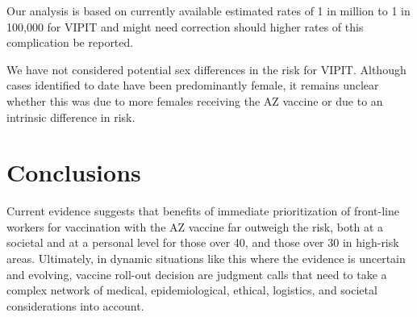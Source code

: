 \documentclass[]{interact}
\theoremstyle{plain}%
\theoremstyle{definition}
\theoremstyle{remark}
\begin{document}
Our analysis is based on currently available estimated rates of 1 in
million to 1 in 100,000 for VIPIT and might need correction should
higher rates of this complication be reported.

We have not considered potential sex differences in the risk for VIPIT.
Although cases identified to date have been predominantly female, it
remains unclear whether this was due to more females receiving the AZ
vaccine or due to an intrinsic difference in risk.

\hypertarget{conclusions}{%
\section{Conclusions}\label{conclusions}}

Current evidence suggests that benefits of immediate prioritization of
front-line workers for vaccination with the AZ vaccine far outweigh the
risk, both at a societal and at a personal level for those over 40, and
those over 30 in high-risk areas. Ultimately, in dynamic situations like
this where the evidence is uncertain and evolving, vaccine roll-out
decision are judgment calls that need to take a complex network of
medical, epidemiological, ethical, logistics, and societal
considerations into account.



\end{document}

